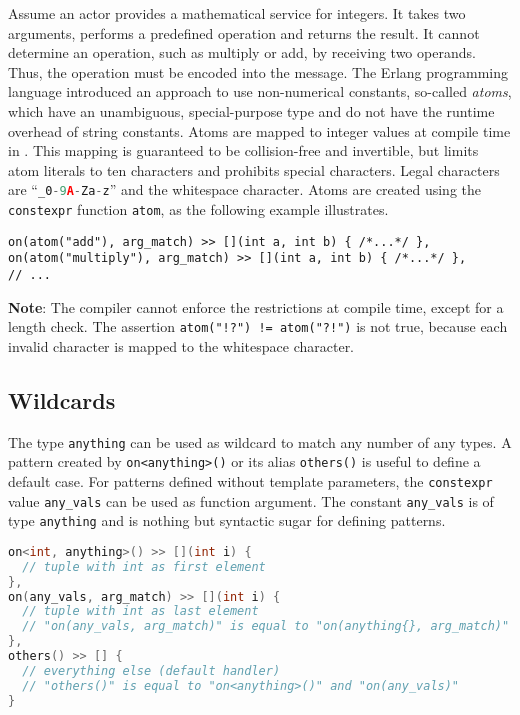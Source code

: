 Assume an actor provides a mathematical service for integers.
It takes two arguments, performs a predefined operation and returns the result.
It cannot determine an operation, such as multiply or add, by receiving two operands.
Thus, the operation must be encoded into the message.
The Erlang programming language introduced an approach to use non-numerical
constants, so-called \textit{atoms}, which have an unambiguous, special-purpose type and do not have the runtime overhead of string constants.
Atoms are mapped to integer values at compile time in \ba.
This mapping is guaranteed to be collision-free and invertible, but limits atom literals to ten characters and prohibits special characters.
Legal characters are ``\lstinline[language=C++]^_0-9A-Za-z^'' and the whitespace character.
Atoms are created using the \lstinline^constexpr^ function \lstinline^atom^, as the following example illustrates.

\begin{lstlisting}
on(atom("add"), arg_match) >> [](int a, int b) { /*...*/ },
on(atom("multiply"), arg_match) >> [](int a, int b) { /*...*/ },
// ...
\end{lstlisting}

\textbf{Note}: The compiler cannot enforce the restrictions at compile time, except for a length check.
The assertion \lstinline^atom("!?") != atom("?!")^ is not true, because each invalid character is mapped to the whitespace character.

\clearpage
\subsection{Wildcards}
\label{Sec::PatternMatching::Wildcards}

The type \lstinline^anything^ can be used as wildcard to match any number of any types.
A pattern created by \lstinline^on<anything>()^ or its alias \lstinline^others()^ is useful to define a default case.
For patterns defined without template parameters, the \lstinline^constexpr^ value \lstinline^any_vals^ can be used as function argument.
The constant \lstinline^any_vals^ is of type \lstinline^anything^ and is nothing but syntactic sugar for defining patterns.

\begin{lstlisting}[language=C++]
on<int, anything>() >> [](int i) {
  // tuple with int as first element
},
on(any_vals, arg_match) >> [](int i) {
  // tuple with int as last element
  // "on(any_vals, arg_match)" is equal to "on(anything{}, arg_match)"
},
others() >> [] {
  // everything else (default handler)
  // "others()" is equal to "on<anything>()" and "on(any_vals)"
}
\end{lstlisting}

